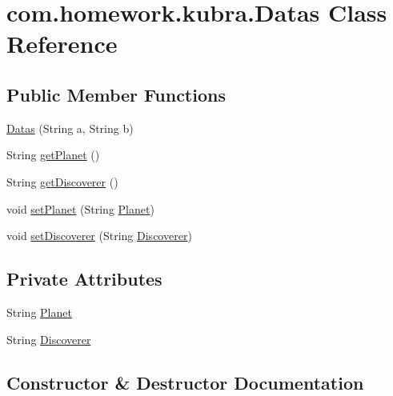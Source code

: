 \hypertarget{classcom_1_1homework_1_1kubra_1_1_datas}{}\section{com.\+homework.\+kubra.\+Datas Class Reference}
\label{classcom_1_1homework_1_1kubra_1_1_datas}
\subsection*{Public Member Functions}
\begin{DoxyCompactItemize}
\item 
\hyperlink{classcom_1_1homework_1_1kubra_1_1_datas_a72aeedd2cd8822c782049e2d19a1761a}{Datas} (String a, String b)
\item 
String \hyperlink{classcom_1_1homework_1_1kubra_1_1_datas_ab102a26b77b58b069fb86e06e46e55ff}{get\+Planet} ()
\item 
String \hyperlink{classcom_1_1homework_1_1kubra_1_1_datas_a5e71c3b68beacab7f3b9ef08c9957444}{get\+Discoverer} ()
\item 
void \hyperlink{classcom_1_1homework_1_1kubra_1_1_datas_af637732f7a0155d4a92bca663fd60182}{set\+Planet} (String \hyperlink{classcom_1_1homework_1_1kubra_1_1_datas_aa640b8a7c100f4c8a34438bfd15bd5c1}{Planet})
\item 
void \hyperlink{classcom_1_1homework_1_1kubra_1_1_datas_a4384c39e4a4c7251e3a252096930f752}{set\+Discoverer} (String \hyperlink{classcom_1_1homework_1_1kubra_1_1_datas_ae3051b78761183beab9a2eec3f21fa3d}{Discoverer})
\end{DoxyCompactItemize}
\subsection*{Private Attributes}
\begin{DoxyCompactItemize}
\item 
String \hyperlink{classcom_1_1homework_1_1kubra_1_1_datas_aa640b8a7c100f4c8a34438bfd15bd5c1}{Planet}
\item 
String \hyperlink{classcom_1_1homework_1_1kubra_1_1_datas_ae3051b78761183beab9a2eec3f21fa3d}{Discoverer}
\end{DoxyCompactItemize}


\subsection{Constructor \& Destructor Documentation}
